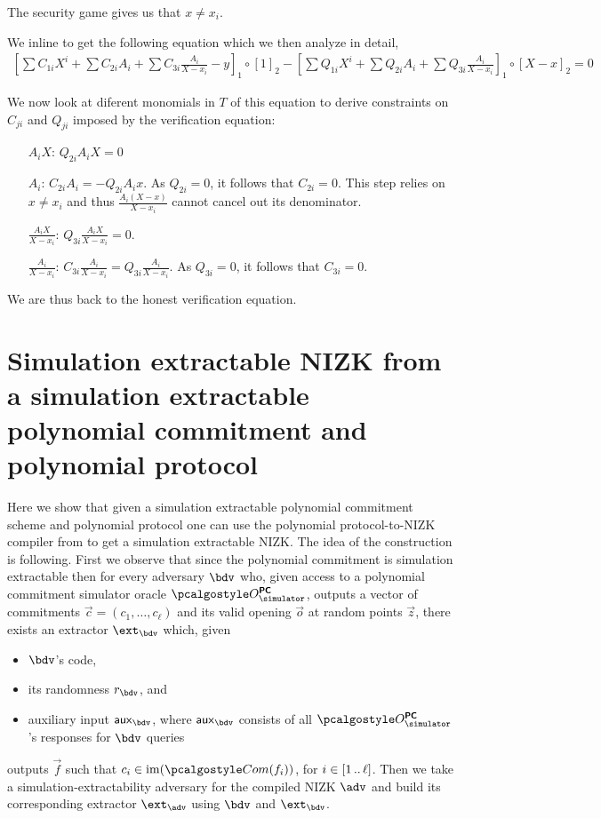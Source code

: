 \documentclass[runningheads,11pt]{llncs}
\begin{document}
The security game gives us that $x \neq x_{i}$.

We inline to get the following equation which we then analyze in detail,
\begin{align*}
  \left[\sum C_{1i} X^{i} + \sum C_{2i} A_{i} + \sum C_{3i} \frac{A_{i}}{X-x_{i}} - y\right]_{1} \circ [1]_{2} - \left[\sum Q_{1i} X^{i} + \sum Q_{2i} A_{i} + \sum Q_{3i} \frac{A_{i}}{X-x_{i}}\right]_{1} \circ [X-x]_{2} = 0
  \end{align*}

We now look at diferent monomials in $T$ of this equation to derive constraints on $C_{ji}$ and $Q_{ji}$ imposed by the verification equation:
\begin{itemize}
  \item[$A_{i}X$:] $Q_{2i} A_{i} X = 0$
  \item[$A_{i}$:] $C_{2i} A_{i} = - Q_{2i}A_{i} x$. As $Q_{2i}=0$, it follows
    that $C_{{2i}}=0$. This step relies on $x \neq x_{i}$ and thus
    $\frac{A_{i} (X-x)}{X-x_{i}}$ cannot cancel out its denominator.
  \item[$\frac{A_{i}X}{X-x_{i}}$:] $Q_{3i} \frac{A_{i} X}{X-x_{i}} = 0$.
  \item[$\frac{A_{i}}{X-x_{i}}$:]
    $C_{3i} \frac{A_{i}}{X-x_{i}} = Q_{{3i}} \frac{A_{i}}{X-x_{i}} $. As
    $Q_{3i}=0$, it follows that $C_{{3i}}=0$.
  \end{itemize}
We are thus back to the honest verification equation.

\section{Simulation extractable NIZK from a simulation extractable polynomial
  commitment and polynomial protocol}
Here we show that given a simulation extractable polynomial commitment scheme
and polynomial protocol one can use the polynomial protocol-to-NIZK compiler
from \cite{EPRINT:GabWilCio19} to get a simulation extractable NIZK. The idea of
the construction is following. First we observe that since the polynomial
commitment is simulation extractable then for every adversary $\bdv$ who, given
access to a polynomial commitment simulator oracle $\oraclespcom$, outputs a
vector of commitments $\vec{c} = (c_1, \ldots, c_\ell)$ and its valid opening $\vec{o}$ at random points
$\vec{z}$, there exists an
extractor $\ext_\bdv$ which, given
\begin{itemize}
\item $\bdv$'s code,
\item its randomness $r_\bdv$, and
\item auxiliary input $\aux_\bdv$, where $\aux_\bdv$ consists of all
  $\oraclespcom$'s responses for $\bdv$ queries
\end{itemize}
outputs $\vec{f}$ such that $c_i \in \image(\com(f_i))$, for
$i \in [1 \, .. \, \ell]$.  Then we take a simulation-extractability adversary for
the compiled NIZK $\adv$ and build its corresponding extractor $\ext_\adv$ using
$\bdv$ and $\ext_\bdv$.
\end{document}
